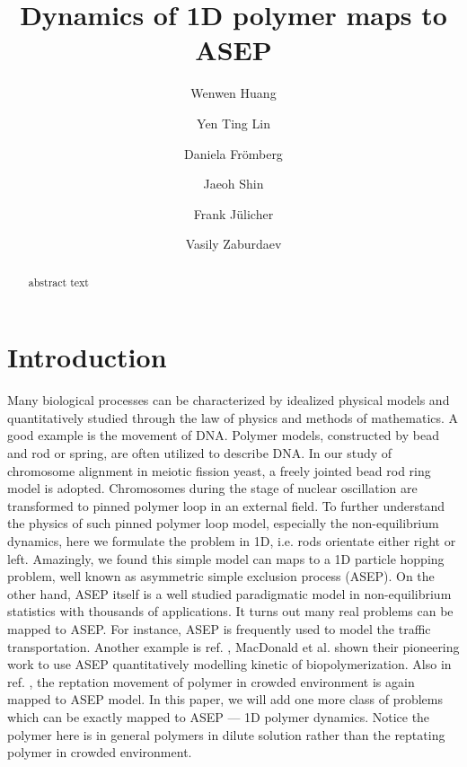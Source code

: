 \documentclass[aps,showpacs,twocolumn,floatfix,prx,superscriptaddress]{revtex4-1}
\begin{document}
\title{Dynamics of 1D polymer maps to ASEP}

\author{Wenwen Huang}
\author{Yen Ting Lin}
\author{Daniela Fr\"{o}mberg}
\author{Jaeoh Shin}
\author{Frank J\"{u}licher}
\author{Vasily Zaburdaev}

\begin{abstract}
    { abstract text }
\end{abstract}
\maketitle


\section{Introduction}
Many biological processes can be characterized by idealized physical models and
quantitatively studied through the law of physics and methods of
mathematics\cite{Vogel2009,Ding2004,Chou2011,Giorgetti2014,Halverson2014}.  A
good example is the movement of DNA. Polymer models, constructed by bead and rod
or spring, are often utilized to describe
DNA\cite{Giorgetti2014,Rosa2008,Sachs1995,Dekker2013,Halverson2014}.  In our study of
chromosome alignment in meiotic fission yeast, a freely jointed bead rod ring
model is adopted\cite{Doi1986,Gennes1981}. Chromosomes during the stage of nuclear oscillation are
transformed to pinned polymer loop in an external field\cite{Lin2015}. To further
understand the physics of such pinned polymer loop model, especially the
non-equilibrium dynamics, here we formulate the
problem in 1D, i.e. rods orientate either right or left. Amazingly, we found
this simple model can maps to a 1D particle hopping problem, well known as
asymmetric simple exclusion process (ASEP)\cite{Derrida1998,Schutz2001}. On the other hand, ASEP
itself is a well studied paradigmatic model in non-equilibrium statistics with
thousands of
applications\cite{Bressloff2013,Macdonald1968,Schadschneider2011k}. It turns out many real problems can be mapped
to ASEP.  For instance, ASEP is frequently used to model the traffic
transportation\cite{Schadschneider2011k}.  Another example is ref.
\cite{Macdonald1968}, MacDonald et al. shown
their pioneering work to use ASEP quantitatively modelling kinetic of
biopolymerization. Also in ref.  \cite{Macdonald1968}, the reptation movement of polymer in
crowded environment is again mapped to ASEP model.  In this paper, we will add
one more class of problems which can be exactly mapped to ASEP --- 1D polymer
dynamics. Notice the polymer here is in general polymers in dilute solution rather
than the reptating polymer in crowded environment.  
\end{document}
